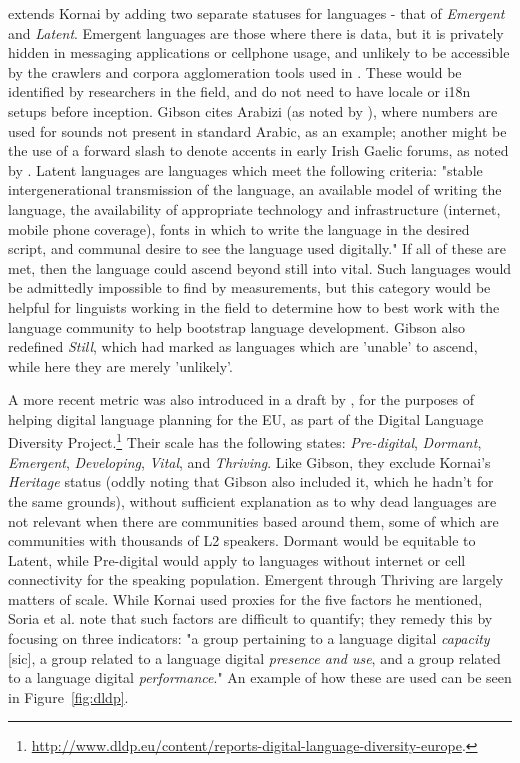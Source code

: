 \citet{gibson2016assessing} extends Kornai by adding two separate statuses for languages - that of {\it Emergent} and {\it Latent}. Emergent languages are those where there is data, but it is privately hidden in messaging applications or cellphone usage, and unlikely to be accessible by the crawlers and corpora agglomeration tools used in \citet{kornai2013digital}. These would be identified by researchers in the field, and do not need to have locale or i18n setups before inception. Gibson cites Arabizi (as noted by \citet{darwish2013arabizi}), where numbers are used for sounds not present in standard Arabic, as an example; another might be the use of a forward slash to denote accents in early Irish Gaelic forums, as noted by \citet{scannell2007crubadan}. Latent languages are languages which meet the following criteria: "stable intergenerational transmission of the language, an available model of writing the language, the availability of appropriate technology and infrastructure (internet, mobile phone coverage), fonts in which to write the language in the desired script, and communal desire to see the language used digitally." If all of these are met, then the language could ascend beyond still into vital. Such languages would be admittedly impossible to find by measurements, but this category would be helpful for linguists working in the field to determine how to best work with the language community to help bootstrap language development. Gibson also redefined {\it Still}, which \citet{kornai2013digital} had marked as languages which are 'unable' to ascend, while here they are merely 'unlikely'.

A more recent metric was also introduced in a draft by \citet{soria2017digital}, for the purposes of helping digital language planning for the EU, as part of the Digital Language Diversity Project.\footnote{\href{http://www.dldp.eu/content/reports-digital-language-diversity-europe}{http://www.dldp.eu/content/reports-digital-language-diversity-europe}. } Their scale has the following states: {\it Pre-digital}, {\it Dormant}, {\it Emergent}, {\it Developing}, {\it Vital}, and {\it Thriving}. Like Gibson, they exclude Kornai's {\it Heritage} status (oddly noting that Gibson also included it, which he hadn't for the same grounds), without sufficient explanation as to why dead languages are not relevant when there are communities based around them, some of which are communities with thousands of L2 speakers. %
Dormant would be equitable to Latent, while Pre-digital would apply to languages without internet or cell connectivity for the speaking population. Emergent through Thriving are largely matters of scale. While Kornai used proxies for the five factors he mentioned, Soria et al. note that such factors are difficult to quantify; they remedy this by focusing on three indicators: "a group pertaining to a language digital {\it capacity} [sic], a group related to a language digital {\it presence and use}, and a group related to a language digital {\it performance}." \citep[5]{soria2017digital} An example of how these are used can be seen in Figure~\ref{fig:dldp}.

